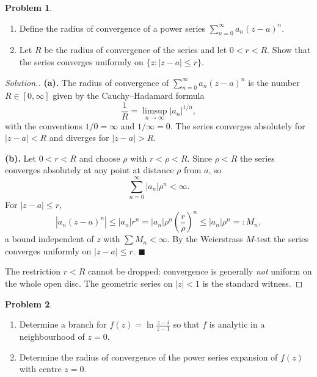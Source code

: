 \documentclass[11pt,a4paper]{article}
\theoremstyle{definition}
\newtheorem{problemx}{Problem}[section]
\newenvironment{problem}{\begin{problemx}}{\end{problemx}}
\newenvironment{solution}
  {\renewcommand{\qedsymbol}{}\begin{proof}[\textit{Solution}.]}
  {\end{proof}}
\begin{document}
\begin{problem}
\begin{enumerate}
\item[(a).] Define the radius of convergence of a power series
$\displaystyle\sum^{\infty}_{n=0} a_n (z - a)^{n}$.
\item[(b).] Let $R$ be the radius of convergence of the series and let
$0 < r < R$. Show that the series converges uniformly on
$\{z : \left|z - a\right| \leq r\}$.
\end{enumerate}
\end{problem}

\begin{solution}
\textbf{(a).} The radius of convergence of
$\displaystyle\sum^{\infty}_{n=0}a_n(z-a)^n$ is the number
$R \in [0,\infty]$ given by the Cauchy--Hadamard formula
$$\frac{1}{R} = \limsup_{n \rightarrow \infty}\left|a_n\right|^{1/n},$$
with the conventions $1/0 = \infty$ and $1/\infty = 0$. The series converges
absolutely for $\left|z-a\right| < R$ and diverges for $\left|z-a\right| > R$.

\textbf{(b).} Let $0 < r < R$ and choose $\rho$ with $r < \rho < R$. Since
$\rho < R$ the series converges absolutely at any point at distance $\rho$ from
$a$, so
$$\sum^{\infty}_{n=0}\left|a_n\right|\rho^{n} < \infty .$$
For $\left|z - a\right| \leq r$,
$$\left|a_n (z-a)^n\right| \leq \left|a_n\right| r^{n}
= \left|a_n\right|\rho^{n}\left(\frac{r}{\rho}\right)^{n}
\leq \left|a_n\right|\rho^{n} =: M_n ,$$
a bound independent of $z$ with $\sum M_n < \infty$. By the Weierstrass
$M$-test the series converges uniformly on $\left|z-a\right| \leq r$.
$\blacksquare$

The restriction $r < R$ cannot be dropped: convergence is generally \emph{not}
uniform on the whole open disc. The geometric series on $\left|z\right|<1$ is the
standard witness.
\end{solution}


\begin{problem}
\begin{enumerate}
\item[(a).] Determine a branch for $f(z) = \ln\frac{z - i}{z - 1}$ so that $f$ is
analytic in a neighbourhood of $z = 0$.
\item[(b).] Determine the radius of convergence of the power series expansion of
$f(z)$ with centre $z = 0$.
\end{enumerate}
\end{problem}
\end{document}
